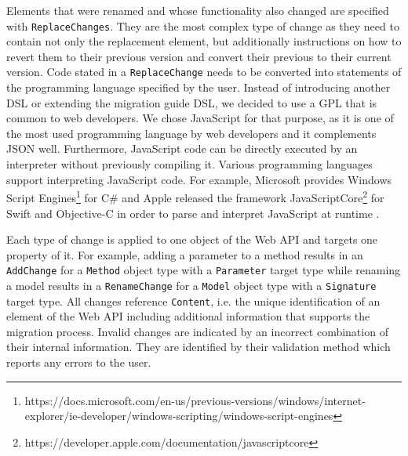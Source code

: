 Elements that were renamed and whose functionality also changed are specified with \texttt{Replace\-Changes}. They are the most complex type of change as they need to contain not only the replacement element, but additionally instructions on how to revert them to their previous version and convert their previous to their current version. Code stated in a \texttt{Replace\-Change} needs to be converted into statements of the programming language specified by the user. Instead of introducing another \ac{DSL} or extending the migration guide \ac{DSL}, we decided to use a \ac{GPL} that is common to web developers. We chose JavaScript for that purpose, as it is one of the most used programming language by web developers and it complements \ac{JSON} well. Furthermore, JavaScript code can be directly executed by an interpreter without previously compiling it. Various programming languages support interpreting JavaScript code. For example, Microsoft provides Windows Script Engines\footnote{https://docs.microsoft.com/en-us/previous-versions/windows/internet-explorer/ie-developer/windows-scripting/windows-script-engines} for C\# and Apple released the framework JavaScriptCore\footnote{https://developer.apple.com/documentation/javascriptcore} for Swift and Objective-C in order to parse and interpret JavaScript at runtime .

Each type of change is applied to one object of the Web API and targets one property of it. For example, adding a parameter to a method results in an \texttt{Add\-Change} for a \texttt{Method} object type with a \texttt{Parameter} target type while renaming a model results in a \texttt{Rename\-Change} for a \texttt{Model} object type with a \texttt{Signature} target type. All changes reference \texttt{Content}, i.e. the unique identification of an element of the Web API including additional information that supports the migration process. Invalid changes are indicated by an incorrect combination of their internal information. They are identified by their validation method which reports any errors to the user.

\begin{figure}[!h]
\end{figure}

